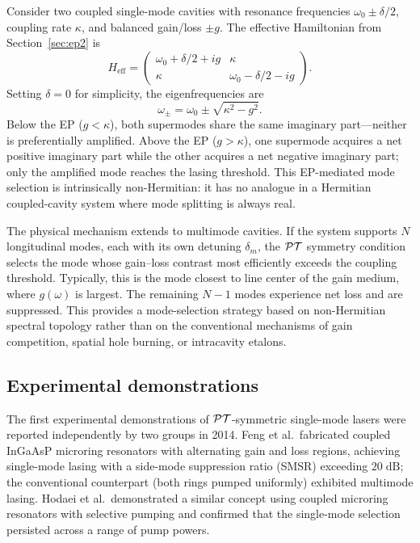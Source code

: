 Consider two coupled single-mode cavities with resonance frequencies
$\omega_0 \pm \delta/2$, coupling rate $\kappa$, and balanced gain/loss
$\pm g$. The effective Hamiltonian from Section~\ref{sec:ep2} is
\begin{equation}
 H_{\mathrm{eff}} = \begin{pmatrix}
 \omega_0 + \delta/2 + ig & \kappa \\
 \kappa & \omega_0 - \delta/2 - ig
 \end{pmatrix}.
 \label{eq:pt-laser-hamiltonian}
\end{equation}
Setting $\delta = 0$ for simplicity, the eigenfrequencies are
\begin{equation}
 \omega_\pm = \omega_0 \pm \sqrt{\kappa^2 - g^2}.
 \label{eq:pt-laser-eigenfreq}
\end{equation}
Below the EP ($g < \kappa$), both supermodes share the same imaginary
part---neither is preferentially amplified. Above the EP ($g > \kappa$),
one supermode acquires a net positive imaginary part while the other
acquires a net negative imaginary part; only the amplified mode reaches
the lasing threshold. This EP-mediated mode selection is intrinsically
non-Hermitian: it has no analogue in a Hermitian coupled-cavity system
where mode splitting is always real.

The physical mechanism extends to multimode cavities. If the system
supports $N$ longitudinal modes, each with its own detuning $\delta_m$,
the $\mathcal{PT}$ symmetry condition selects the mode whose gain--loss contrast
most efficiently exceeds the coupling threshold. Typically, this is the
mode closest to line center of the gain medium, where $g(\omega)$ is
largest. The remaining $N-1$ modes experience net loss and are
suppressed. This provides a mode-selection strategy based on
non-Hermitian spectral topology rather than on the conventional
mechanisms of gain competition, spatial hole burning, or intracavity
etalons.

\subsection{Experimental demonstrations}
\label{ssec:pt-laser-expt}

The first experimental demonstrations of $\mathcal{PT}$-symmetric single-mode
lasers were reported independently by two groups in 2014. Feng et al.\
fabricated coupled InGaAsP microring resonators with alternating
gain and loss regions, achieving single-mode lasing with a side-mode
suppression ratio (SMSR) exceeding $20\;\mathrm{dB}$; the conventional
counterpart (both rings pumped uniformly) exhibited multimode lasing.
Hodaei et al.\ demonstrated a similar concept using coupled microring
resonators with selective pumping and confirmed that the single-mode
selection persisted across a range of pump powers.

